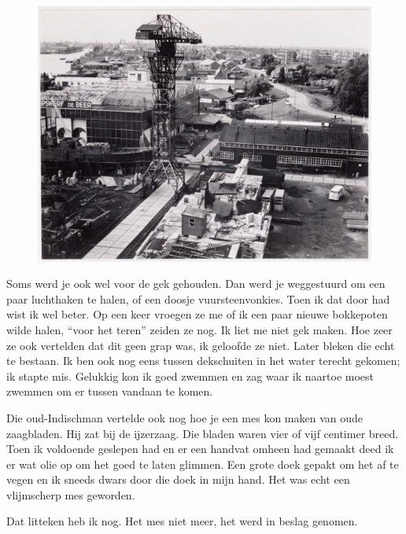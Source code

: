 \documentclass[10pt,twoside, openright]{memoir}
\begin{document}
\begin{figure}
\includegraphics[width=\textwidth]{img/90deBeer}
\end{figure}

Soms werd je ook wel voor de gek gehouden. Dan werd je weggestuurd om een paar luchthaken te halen, of een doosje vuursteenvonkies. Toen ik dat door had wist ik wel beter. Op een keer vroegen ze me of ik een paar nieuwe bokkepoten wilde halen, ``voor het teren'' zeiden ze nog. Ik liet me niet gek maken. Hoe zeer ze ook vertelden dat dit geen grap was, ik geloofde ze niet. Later bleken die echt te bestaan. Ik ben ook nog eens tussen dekschuiten in het water terecht gekomen; ik stapte mis. Gelukkig kon ik goed zwemmen en zag waar ik naartoe moest zwemmen om er tussen vandaan te komen. 

Die oud-Indischman vertelde ook nog hoe je een mes kon maken van oude zaagbladen. Hij zat bij de ijzerzaag. Die bladen waren vier of vijf centimer breed. Toen ik voldoende geslepen had en er een handvat omheen had gemaakt deed ik er wat olie op om het goed te laten glimmen. Een grote doek gepakt om het af te vegen en ik sneeds dwars door die doek in mijn hand. Het was echt een vlijmscherp mes geworden. 

Dat litteken heb ik nog. Het mes niet meer, het werd in beslag genomen.
\end{document}
